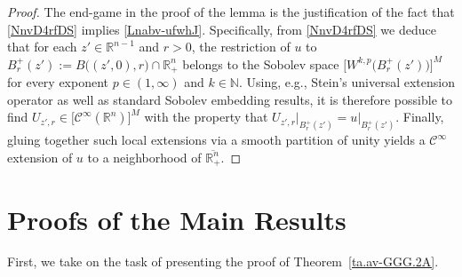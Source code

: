\documentclass[11pt,reqno]{amsart}
\numberwithin{equation}{section}
\theoremstyle{remark}
\begin{document}
\begin{proof}
The end-game in the proof of the lemma is the justification of the fact 
that \eqref{NnvD4rfDS} implies \eqref{Lnabv-ufwhJ}. Specifically, from 
\eqref{NnvD4rfDS} we deduce that for each $z'\in{\mathbb{R}}^{n-1}$ and $r>0$, 
the restriction of $u$ to $B^{+}_r(z'):=B\big((z',0),r\big)\cap{\mathbb{R}}^n_{+}$
belongs to the Sobolev space $\big[W^{k,p}\big(B^{+}_r(z')\big)\big]^M$ for every exponent
$p\in(1,\infty)$ and $k\in{\mathbb{N}}$. Using, e.g., Stein's universal extension 
operator as well as standard Sobolev embedding results, it is therefore possible 
to find $U_{z',r}\in\big[{\mathscr{C}}^\infty({\mathbb{R}}^n)\big]^M$ with the property that
$U_{z',r}\big|_{B^{+}_r(z')}=u\big|_{B^{+}_r(z')}$. Finally, gluing together such 
local extensions via a smooth partition of unity yields a ${\mathscr{C}}^\infty$ 
extension of $u$ to a neighborhood of $\overline{{\mathbb{R}}^n_{+}}$. 
\end{proof}




\section{Proofs of the Main Results}
\setcounter{equation}{0}
\label{S-3}

First, we take on the task of presenting the proof of Theorem~\ref{ta.av-GGG.2A}.
\end{document}

